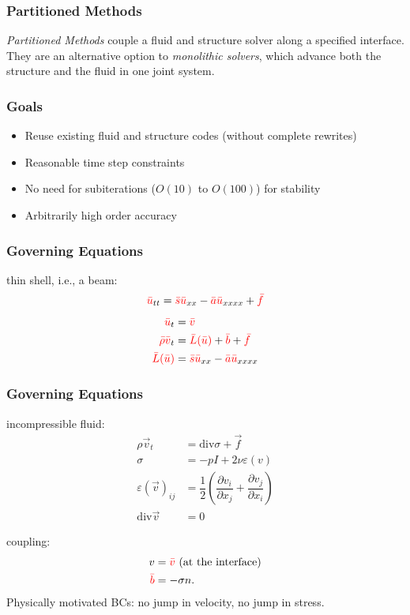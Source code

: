 \documentclass[8pt]{beamer}
\newcommand{\leftd}[1]{{\color{red} \bar{#1}}}
\newcommand{\leftdd}[2]{{\color{red} \bar{#1}(\bar{#2})}}
\newcommand{\divergence}{\mathrm{div}}
\begin{document}
\begin{frame}
    \frametitle{Partitioned Methods}
    \emph{Partitioned Methods} couple a fluid and structure solver along a
    specified interface. They are an alternative option to \emph{monolithic
    solvers}, which advance both the structure and the fluid in one joint
    system.
\end{frame}

\begin{frame}
    \frametitle{Goals}
    \begin{itemize}
        \item Reuse existing fluid and structure codes (without complete
              rewrites)
        \item Reasonable time step constraints
        \item No need for subiterations (\(O(10)\) to \(O(100)\)) for stability
        \item Arbitrarily high order accuracy
    \end{itemize}
\end{frame}

\begin{frame}
    \frametitle{Governing Equations}
    thin shell, i.e., a beam:
    \begin{equation}
        \leftd{u}_{tt} = \leftd{s} \leftd{u}_{xx} - \leftd{a} \leftd{u}_{xxxx}
        + \leftd{f}
    \end{equation}
    \pause
    \begin{align}
        \leftd{u}_t              &= \leftd{v}                                 \\
        \leftd{\rho} \leftd{v}_t &= \leftdd{L}{u} + \leftd{b} + \leftd{f}     \\
        \leftdd{L}{u}            &= \leftd{s} \leftd{u}_{xx}
        - \leftd{a} \leftd{u}_{xxxx}
    \end{align}
\end{frame}

\begin{frame}
    \frametitle{Governing Equations}
    incompressible fluid:
    \begin{align}
        \rho \vec{v}_t &= \divergence \sigma + \vec{f}                        \\
        \sigma &= -p I + 2 \nu \varepsilon(v)                                 \\
        \varepsilon(\vec{v})_{ij} &= \dfrac{1}{2}
        \left(
        \dfrac{\partial v_i}{\partial x_j} +
        \dfrac{\partial v_j}{\partial x_i}
        \right)                                                               \\
        \divergence \vec{v} &= 0
    \end{align}

    \pause
    coupling:
    \begin{align}
        v &= \leftd{v} \text{ (at the interface)}                             \\
        \leftd{b} &= -\sigma n.
    \end{align}
    \pause
    Physically motivated BCs: no jump in velocity, no jump in stress.
\end{frame}
\end{document}
